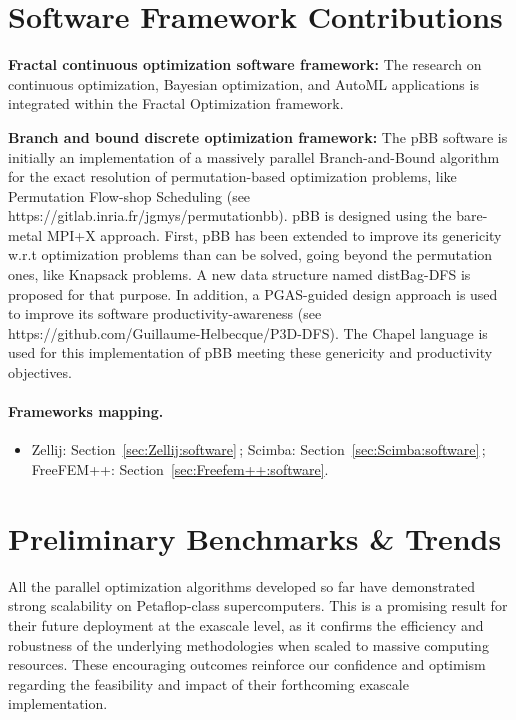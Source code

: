 %   

\section{Software Framework Contributions}
{\bf Fractal continuous optimization software framework:} The research on continuous optimization, Bayesian optimization, and AutoML applications is integrated within the Fractal Optimization framework.

\medskip

{\bf Branch and bound discrete optimization framework:} The pBB software is initially an implementation of a massively parallel Branch-and-Bound algorithm for
the exact resolution of permutation-based optimization problems, like Permutation Flow-shop
Scheduling (see https://gitlab.inria.fr/jgmys/permutationbb). pBB is designed using
the bare-metal MPI+X approach. First, pBB has been extended to improve its genericity w.r.t
optimization problems than can be solved, going beyond the permutation ones, like Knapsack
problems. A new data structure named distBag-DFS is proposed for that purpose. In addition,
a PGAS-guided design approach is used to improve its software productivity-awareness (see
https://github.com/Guillaume-Helbecque/P3D-DFS). The Chapel language is used for this
implementation of pBB meeting these genericity and productivity objectives.

\medskip


\paragraph{Frameworks mapping.}
\begin{itemize}
	\item Zellij: Section~\ref{sec:Zellij:software}\,; Scimba: Section~\ref{sec:Scimba:software}\,; FreeFEM++: Section~\ref{sec:Freefem++:software}.
\end{itemize}

\section{Preliminary Benchmarks \& Trends}

All the parallel optimization algorithms developed so far have demonstrated strong scalability on Petaflop-class supercomputers. This is a promising result for their future deployment at the exascale level, as it confirms the efficiency and robustness of the underlying methodologies when scaled to massive computing resources. These encouraging outcomes reinforce our confidence and optimism regarding the feasibility and impact of their forthcoming exascale implementation.

